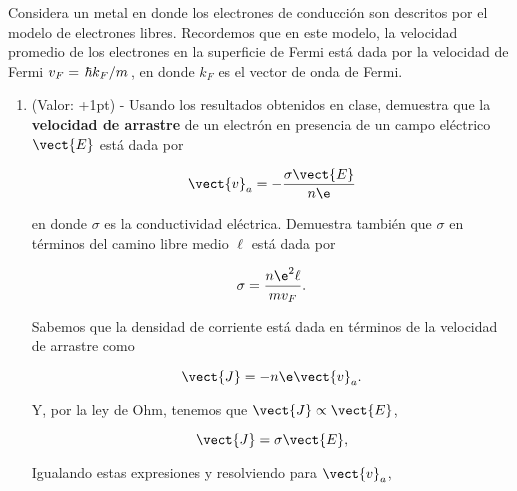 \documentclass[./../main.tex]{subfiles}
\begin{document}
    \color{blue}
    \begin{exercise}
        Considera un metal en donde los electrones de conducción son descritos por el modelo de electrones libres. Recordemos que en este modelo, la velocidad promedio de los electrones en la superficie de Fermi está dada por la velocidad de Fermi \(v_{F} = \slashfrac{\hbar k_{F}}{m}\), en donde \(k_{F}\) es el vector de onda de Fermi.

        \begin{enumerate}
            \item (Valor: +1pt) - Usando los resultados obtenidos en clase, demuestra que la \textbf{velocidad de arrastre} de un electrón en presencia de un campo eléctrico \(\vect{E}\) está dada por
            
            \begin{equation}
                \vect{v}_{a} = -\dfrac{\sigma\vect{E}}{n\e}
                \label{eq:DriftSpeed}
            \end{equation}

            en donde \(\sigma\) es la conductividad eléctrica. Demuestra también que \(\sigma\) en términos del camino libre medio \(\ell\) está dada por

            \begin{equation}
                \sigma = \dfrac{n\e^{2}\ell}{mv_{F}}.
                \label{eq:Conductivity}
            \end{equation}

            \color{black}
            \begin{solution}
                Sabemos que la densidad de corriente está dada en términos de la velocidad de arrastre como

                \begin{equation}
                    \vect{J} = -n\e\vect{v}_{a}.
                    \label{eq:CurrentDensity}
                \end{equation}

                Y, por la ley de Ohm, tenemos que \(\vect{J} \propto \vect{E}\), \idest

                \begin{equation}
                    \vect{J} = \sigma\vect{E},
                    \label{eq:OhmLawCurrentDensity}
                \end{equation}

                Igualando estas expresiones y resolviendo para \(\vect{v}_{a}\),


\end{solution}
\end{enumerate}
\end{exercise}
\end{document}
